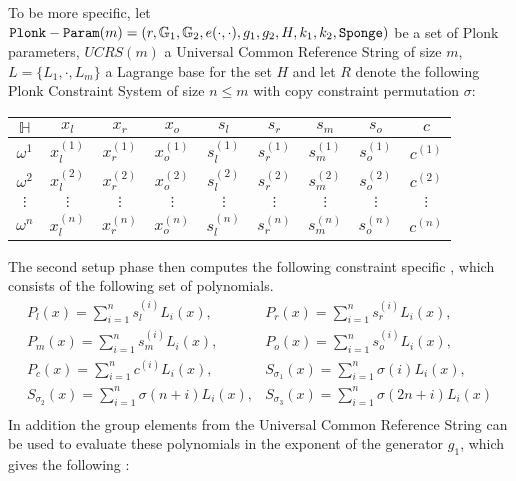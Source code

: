 To be more specific, let $\mathtt{Plonk-Param}(m)=(r, \mathbb{G}_1, \mathbb{G}_2, e(\cdot,\cdot), g_1,g_2, H, k_1,k_2, \mathtt{Sponge})$ be a set of Plonk parameters, $UCRS(m)$ a Universal Common Reference String of size $m$, $L=\{L_1,\cdot,L_m\}$ a Lagrange base for the set $H$ and let $R$ denote the following Plonk Constraint System of size $n\leq m$ with copy constraint permutation $\sigma$:
\begin{table}[H]
\centering
\begin{tabular}{|c|ccc|cccc|c|}
\hline
$\mathbb{H}$ & $x_l$ & $x_r$ & $x_o$ & $s_l$ & $s_r$ & $s_m$ & $s_o$ & $c$ \\ \hline
$\omega^1$ & $x_l^{(1)}$ & $x_r^{(1)}$ & $x_o^{(1)}$ & $s_l^{(1)}$ & $s_r^{(1)}$ & $s_m^{(1)}$ & $s_o^{(1)}$ & $c^{(1)}$ \\
$\omega^2$ & $x_l^{(2)}$ & $x_r^{(2)}$ & $x_o^{(2)}$ & $s_l^{(2)}$ & $s_r^{(2)}$ & $s_m^{(2)}$ & $s_o^{(2)}$ & $c^{(2)}$ \\
$\vdots$ & $\vdots$ & $\vdots$ & $\vdots$ & $\vdots$ & $\vdots$ & $\vdots$ & $\vdots$ & $\vdots$ \\
$\omega^n$ & $x_l^{(n)}$ & $x_r^{(n)}$ & $x_o^{(n)}$ & $s_l^{(n)}$ & $s_r^{(n)}$ & $s_m^{(n)}$ & $s_o^{(n)}$ & $c^{(n)}$ \\ \hline
\end{tabular}
\end{table}
The second setup phase then computes the following constraint specific , which consists of the following set of polynomials.
\begin{equation*}
\label{def:plonk-circuit-pk}
\begin{array}{ll}
P_{l}(x) = \sum_{i=1}^{n} s_l^{(i)}L_i(x), & P_{r}(x) = \sum_{i=1}^{n} s_r^{(i)}L_i(x), \\
P_{m}(x) = \sum_{i=1}^{n} s_m^{(i)}L_i(x), & P_{o}(x) = \sum_{i=1}^{n} s_o^{(i)}L_i(x), \\
P_{c}(x) = \sum_{i=1}^{n} c^{(i)}L_i(x), & S_{\sigma_1}(x) = \sum_{i=1}^{n} \sigma(i)L_i(x), \\
S_{\sigma_2}(x) = \sum_{i=1}^{n} \sigma(n+i)L_i(x), & S_{\sigma_3}(x) = \sum_{i=1}^{n} \sigma(2n+i)L_i(x) \\
\end{array}
\end{equation*}
In addition the group elements from the Universal Common Reference String can be used to evaluate these polynomials in the exponent of the generator $g_1$, which gives the following :
